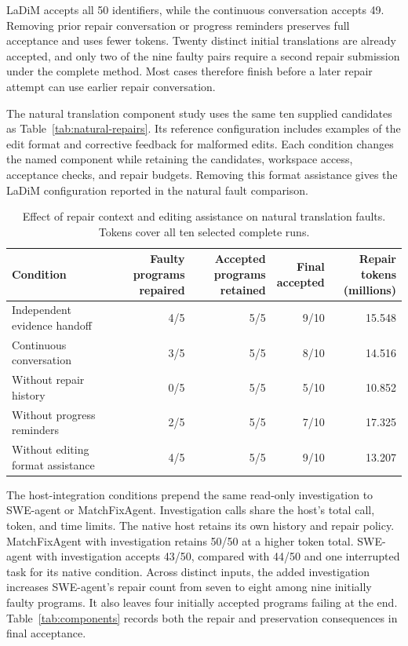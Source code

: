 \documentclass{article}
\newcommand{\thead}[1]{\textbf{\shortstack[b]{#1}}}
\begin{document}
LaDiM accepts all 50 identifiers, while the continuous conversation accepts 49. Removing prior repair conversation or progress reminders preserves full acceptance and uses fewer tokens. Twenty distinct initial translations are already accepted, and only two of the nine faulty pairs require a second repair submission under the complete method. Most cases therefore finish before a later repair attempt can use earlier repair conversation.

The natural translation component study uses the same ten supplied candidates as Table~\ref{tab:natural-repairs}. Its reference configuration includes examples of the edit format and corrective feedback for malformed edits. Each condition changes the named component while retaining the candidates, workspace access, acceptance checks, and repair budgets. Removing this format assistance gives the LaDiM configuration reported in the natural fault comparison.

\begin{table}[!htb]
\caption{Effect of repair context and editing assistance on natural translation faults. Tokens cover all ten selected complete runs.}
\label{tab:natural-components}
\centering
\small
\setlength{\tabcolsep}{3pt}

\begin{tabular*}{\linewidth}{@{\extracolsep{\fill}}lrrrr@{}}
\toprule
\textbf{Condition} & \thead{Faulty\\programs repaired} & \thead{Accepted programs\\retained} & \thead{Final\\accepted} & \thead{Repair tokens\\(millions)} \\
\midrule
Independent evidence handoff & 4/5 & 5/5 & 9/10 & 15.548 \\
Continuous conversation & 3/5 & 5/5 & 8/10 & 14.516 \\
Without repair history & 0/5 & 5/5 & 5/10 & 10.852 \\
Without progress reminders & 2/5 & 5/5 & 7/10 & 17.325 \\
Without editing format assistance & 4/5 & 5/5 & 9/10 & 13.207 \\
\bottomrule
\end{tabular*}


\end{table}


The host-integration conditions prepend the same read-only investigation to SWE-agent or MatchFixAgent. Investigation calls share the host's total call, token, and time limits. The native host retains its own history and repair policy. MatchFixAgent with investigation retains 50/50 at a higher token total. SWE-agent with investigation accepts 43/50, compared with 44/50 and one interrupted task for its native condition. Across distinct inputs, the added investigation increases SWE-agent's repair count from seven to eight among nine initially faulty programs. It also leaves four initially accepted programs failing at the end. Table~\ref{tab:components} records both the repair and preservation consequences in final acceptance.
\end{document}
